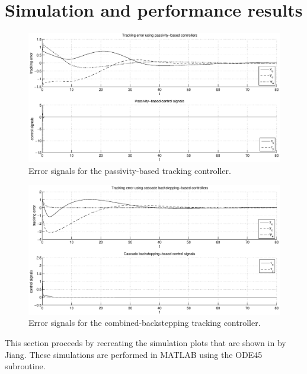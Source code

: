 \documentclass[amsthm, twocolumn]{autart}
\begin{document}
{\section{Simulation and performance results}
%
%
\begin{figure}[!ht]
\begin{center}
\centering 
\includegraphics[scale=0.42, trim = 30mm 5mm 30mm 5mm, clip]{FIG_passivity_errors.eps}
\caption{Error signals for the passivity-based tracking controller.}
\label{fig:pass_error}
\end{center}
\end{figure}
\begin{figure}[!ht]
\begin{center}
\centering 
\includegraphics[scale=0.42, trim = 30mm 5mm 30mm 5mm, clip]{FIG_backstepping_errors.eps}
\caption{Error signals for the combined-backstepping tracking controller.}
\label{fig:back_error}
\end{center}
\end{figure}
%
%
This section proceeds by recreating the simulation plots that are shown in \cite{Jiang02} by Jiang. These simulations are performed in MATLAB using the {\sf ODE45} subroutine.

}
\end{document}
